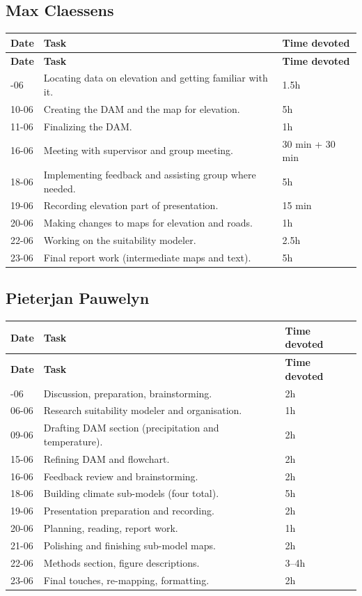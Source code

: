 \subsection*{Max Claessens}
\begin{longtable}{@{}p{2cm}p{9.5cm}p{2.5cm}@{}}
\toprule
\textbf{Date} & \textbf{Task} & \textbf{Time devoted} \\
\midrule
\endfirsthead
\toprule
\textbf{Date} & \textbf{Task} & \textbf{Time devoted} \\
\midrule
\endhead
\bottomrule
\endfoot
05-06 & Locating data on elevation and getting familiar with it. & 1.5h \\
10-06 & Creating the DAM and the map for elevation. & 5h \\
11-06 & Finalizing the DAM. & 1h \\
16-06 & Meeting with supervisor and group meeting. & 30 min + 30 min \\
18-06 & Implementing feedback and assisting group where needed. & 5h \\
19-06 & Recording elevation part of presentation. & 15 min \\
20-06 & Making changes to maps for elevation and roads. & 1h \\
22-06 & Working on the suitability modeler. & 2.5h \\
23-06 & Final report work (intermediate maps and text). & 5h \\
\end{longtable}

\subsection*{Pieterjan Pauwelyn}
\begin{longtable}{@{}p{2cm}p{9.5cm}p{2.5cm}@{}}
\toprule
\textbf{Date} & \textbf{Task} & \textbf{Time devoted} \\
\midrule
\endfirsthead
\toprule
\textbf{Date} & \textbf{Task} & \textbf{Time devoted} \\
\midrule
\endhead
\bottomrule
\endfoot
04-06 & Discussion, preparation, brainstorming. & 2h \\
06-06 & Research suitability modeler and organisation. & 1h \\
09-06 & Drafting DAM section (precipitation and temperature). & 2h \\
15-06 & Refining DAM and flowchart. & 2h \\
16-06 & Feedback review and brainstorming. & 2h \\
18-06 & Building climate sub-models (four total). & 5h \\
19-06 & Presentation preparation and recording. & 2h \\
20-06 & Planning, reading, report work. & 1h \\
21-06 & Polishing and finishing sub-model maps. & 2h \\
22-06 & Methods section, figure descriptions. & 3--4h \\
23-06 & Final touches, re-mapping, formatting. & 2h \\
\end{longtable}

